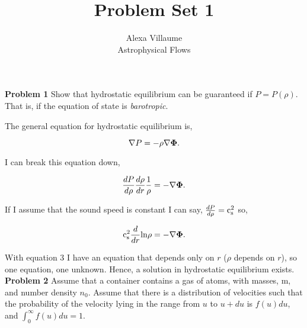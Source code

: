 \documentclass[12pt]{article}
\begin{document}
 
 \title{Problem Set 1}
\author{Alexa Villaume\\ 
Astrophysical Flows} 
 
\maketitle

\noindent \textbf{Problem 1} Show that hydrostatic equilibrium can be guaranteed if $P = P(\rho)$. That is, if the
equation of state is {\it barotropic}. 

 The general equation for hydrostatic equilibrium is, 
 
 \begin{equation}
 \nabla P = -\rho {\bf \nabla \Phi}.
 \end{equation}
 
\noindent I can break this equation down,
 
 \begin{equation}
 \frac{dP}{d\rho}\frac{d\rho}{dr} \frac{1}{\rho} = -{\bf \nabla \Phi}.
 \end{equation}
 
 \noindent If I assume that the sound speed is constant I can say, $\frac{dP}{d\rho} = {\rm c_s^2}$ so,
 
 \begin{equation}
 {\rm c_s^2} \frac{d}{dr} {\rm ln}\rho = -{\bf \nabla \Phi}.
 \end{equation}
 
 \noindent With equation 3 I have an equation that depends only on $r$ ($\rho$ depends on $r$), so one equation, one unknown. Hence, a solution  in hydrostatic equilibrium exists. \\
 
 \noindent \textbf{Problem 2} Assume that a container contains a gas of atoms, with masses, m, and number density
$n_0$. Assume that there is a distribution of velocities such that the probability of the velocity lying in the range from $u$ to $u + du$ is $f(u)du$, and $\int_0^\infty f(u)du =1$.
\end{document}
